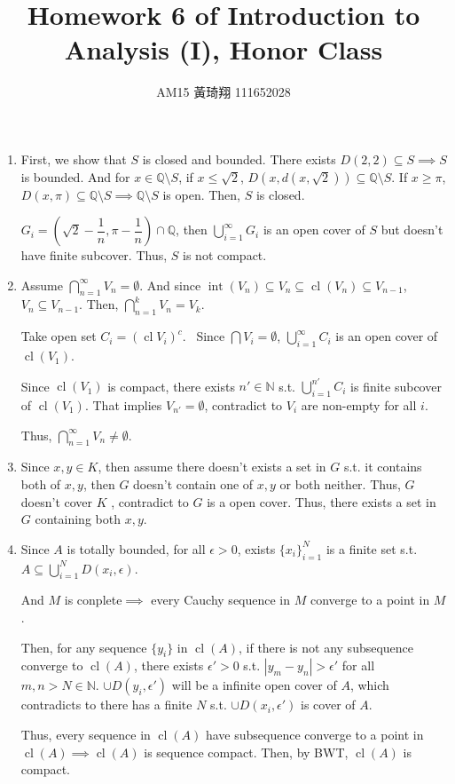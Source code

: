 \documentclass[12pt]{article}
\title{Homework 6 of Introduction to Analysis (I), Honor Class}
\author{AM15 黃琦翔 111652028}
\DeclareMathOperator{\closure}{cl}
\DeclareMathOperator{\interior}{int}
\begin{document}
\maketitle
\begin{enumerate}
    \item First, we show that $S$ is closed and bounded. There exists $D(2, 2) \subseteq S\implies S$ is bounded.
    And for $x\in \mathbb{Q}\setminus S$, if $x\leq \sqrt{2}$, $D(x, d(x, \sqrt{2}))\subseteq \mathbb{Q}\setminus S$. If $x\geq \pi$, $D(x, \pi) \subseteq \mathbb{Q}\setminus S\implies \mathbb{Q}\setminus S$ is open.
    Then, $S$ is closed.

    $G_i = (\sqrt{2} - \dfrac{1}{n}, \pi - \dfrac{1}{n}) \cap \mathbb{Q}$, then $\displaystyle\bigcup_{i=1}^{\infty} G_i$ is an open cover of $S$ but doesn't have finite subcover.
    Thus, $S$ is not compact.

    \item Assume $\displaystyle\bigcap_{n=1}^{\infty} V_n = \emptyset$.
    And since $\interior(V_n) \subseteq V_n \subseteq \closure(V_n) \subseteq V_{n-1}$, $V_n \subseteq V_{n-1}$.
    Then, $\displaystyle\bigcap_{n=1}^{k} V_n = V_k$.

    Take open set $C_i = (\closure V_i)^c$. \
    Since $\bigcap V_i = \emptyset$, $\displaystyle\bigcup_{i=1}^{\infty} C_i$ is an open cover of $\closure(V_1)$.

    Since $\closure(V_1)$ is compact, there exists $n' \in \mathbb{N}$ s.t. $\displaystyle\bigcup_{i=1}^{n'} C_i$ is finite subcover of $\closure(V_1)$.
    That implies $V_{n'} = \emptyset$, contradict to $V_i$ are non-empty for all $i$.

    Thus, $\displaystyle\bigcap_{n=1}^{\infty} V_n \neq \emptyset$.

    \item Since $x, y\in K$, then assume there doesn't exists a set in $G$ s.t. it contains both of $x, y$, then $G$ doesn't contain one of $x, y$ or both neither.
    Thus, $G$ doesn't cover $K$ , contradict to $G$ is a open cover. Thus, there exists a set in $G$ containing both $x, y$.

    \newpage
    \item Since $A$ is totally bounded, for all $\epsilon > 0$, exists $\lbrace x_i\rbrace_{i=1}^N$ is a finite set s.t. $A \subseteq \displaystyle\bigcup_{i=1}^N D(x_i, \epsilon)$.
    
    And $M$ is conplete$\implies$ every Cauchy sequence in $M$ converge to a point in $M$.

    Then, for any sequence $\lbrace y_i\rbrace$ in $\closure(A)$, if there is not any subsequence converge to $\closure(A)$, there exists $\epsilon' > 0$ s.t. $|y_m-y_n| > \epsilon'$ for all $m, n > N\in \mathbb{N}$.
    $\cup D(y_i, \epsilon')$ will be a infinite open cover of $A$, which contradicts to there has a finite $N$ s.t. $\cup D(x_i, \epsilon')$ is cover of $A$.

    Thus, every sequence in $\closure(A)$ have subsequence converge to a point in $\closure(A)\implies \closure(A)$ is sequence compact.
    Then, by BWT, $\closure(A)$ is compact.
\end{enumerate}
\end{document}

